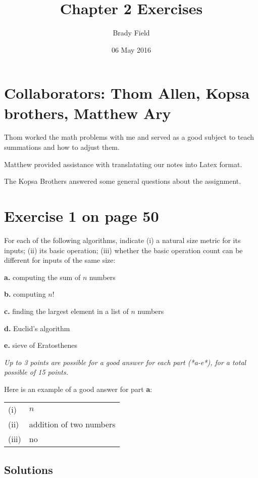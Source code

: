 \documentclass[11pt]{article}
\title{Chapter 2 Exercises}
\author{Brady Field}
\date{06 May 2016}
\begin{document}
\maketitle


\section*{Collaborators: Thom Allen, Kopsa brothers, Matthew Ary}
\label{sec-1}

Thom worked the math problems with me and served as a good subject to teach summations and how to adjust them.

Matthew provided assistance with translatating our notes into Latex format.

The Kopsa Brothers answered some general questions about the assignment.

\section*{Exercise 1 on page 50}
\label{sec-2}


For each of the following algorithms, indicate (i) a natural size metric
for its inputs; (ii) its basic operation; (iii) whether the basic operation count
can be different for inputs of the same size:

\textbf{a.} computing the sum of \(n\) numbers

\textbf{b.} computing \(n!\)

\textbf{c.} finding the largest element in a list of \(n\) numbers

\textbf{d.} Euclid's algorithm

\textbf{e.} sieve of Eratosthenes

\emph{Up to 3 points are possible for a good answer for each part (*a-e*), for a total possible of 15 points.}

Here is an example of a good answer for part \textbf{a}:


\begin{center}
\begin{tabular}{ll}
 (i)    &  \(n\)                    \\
 (ii)   &  addition of two numbers  \\
 (iii)  &  no                       \\
\end{tabular}
\end{center}



\subsection*{Solutions}
\label{sec-2.1}
\end{document}
